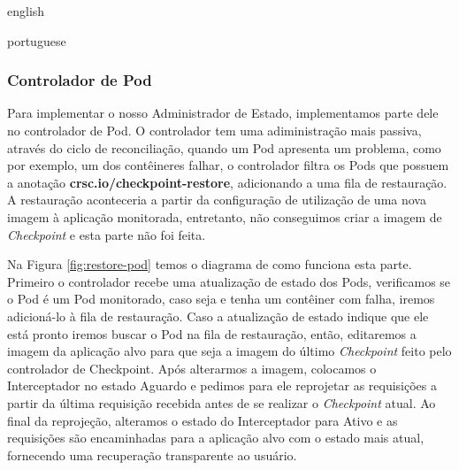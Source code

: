 \begin{otherlanguage*}{english}
\begin{otherlanguage*}{portuguese}
\subsubsection{Controlador de Pod}

Para implementar o nosso Administrador de Estado, implementamos parte dele no controlador
de Pod. O controlador tem uma adiministração mais passiva, através do ciclo de
reconciliação, quando um Pod apresenta um problema, como por exemplo, um dos contêineres
falhar, o controlador filtra os Pods que possuem a anotação
\textbf{crsc.io/checkpoint-restore}, adicionando a uma fila de restauração.
A restauração aconteceria a partir da configuração de utilização de uma nova
imagem à aplicação monitorada, entretanto, não conseguimos criar a imagem de
\textit{Checkpoint} e esta parte não foi feita.

Na Figura \ref{fig:restore-pod} temos o diagrama de como funciona esta parte. Primeiro o
controlador recebe uma atualização de estado dos Pods, verificamos se o Pod é um Pod monitorado,
caso seja e tenha um contêiner com falha, iremos adicioná-lo à fila de restauração. Caso a
atualização de estado indique que ele está pronto iremos buscar o Pod na fila de restauração,
então, editaremos a imagem da aplicação alvo para que seja a imagem do último \textit{Checkpoint}
feito pelo controlador de Checkpoint. Após alterarmos a imagem, colocamos o Interceptador no
estado Aguardo e pedimos para ele reprojetar as requisições a partir da última requisição
recebida antes de se realizar o \textit{Checkpoint} atual. Ao final da reprojeção, alteramos
o estado do Interceptador para Ativo e as requisições são encaminhadas para a aplicação alvo
com o estado mais atual, fornecendo uma recuperação transparente ao usuário.


\end{otherlanguage*}
\end{otherlanguage*}
